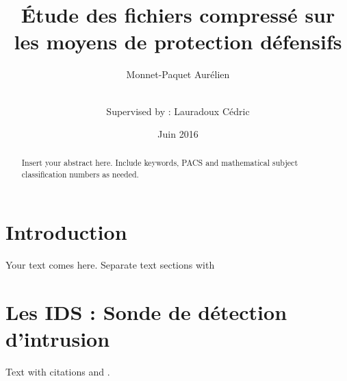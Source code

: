 \documentclass[smallextended]{svjour3}       %
\begin{document}
\title{Étude des fichiers compressé sur les moyens de protection défensifs}


\author{Monnet-Paquet Aurélien  \\ \and \\
        Supervised by : Lauradoux Cédric
}



\date{Juin 2016}


\maketitle

\begin{abstract}
Insert your abstract here. Include keywords, PACS and mathematical
subject classification numbers as needed.
\end{abstract}

\section{Introduction}
\label{intro}
Your text comes here. Separate text sections with

\newpage
\section{Les IDS : Sonde de détection d'intrusion}
\label{sec1:ids}
Text with citations \cite{Suricata} and \cite{virustotal}.
\end{document}
